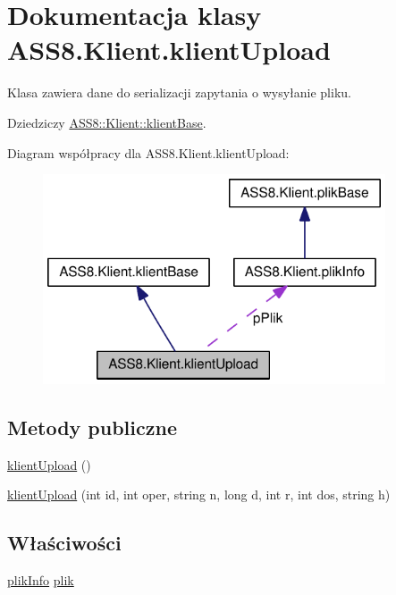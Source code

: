 \hypertarget{a00011}{
\section{Dokumentacja klasy ASS8.Klient.klientUpload}
\label{da/d45/a00011}
}
Klasa zawiera dane do serializacji zapytania o wysyłanie pliku.  


Dziedziczy \hyperlink{a00007}{ASS8::Klient::klientBase}.

Diagram współpracy dla ASS8.Klient.klientUpload:\nopagebreak
\begin{figure}[H]
\begin{center}
\leavevmode
\includegraphics[width=287pt]{d7/da0/a00198}
\end{center}
\end{figure}
\subsection*{Metody publiczne}
\begin{CompactItemize}
\item 
\hyperlink{a00011_360231a3cc7ad8d86b5245eaeec18711}{klientUpload} ()
\item 
\hyperlink{a00011_8a61f3de65e9fe569185ad9a70c8865f}{klientUpload} (int id, int oper, string n, long d, int r, int dos, string h)
\end{CompactItemize}
\subsection*{Właściwości}
\begin{CompactItemize}
\item 
\hyperlink{a00018}{plikInfo} \hyperlink{a00011_768e461c6c80e2703893b7634d00146b}{plik}
\end{CompactItemize}
